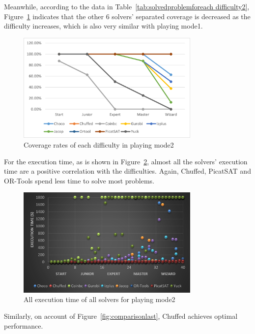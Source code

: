 Meanwhile, according to the data in Table~\ref{tab:solvedproblemforeach difficulty2}, Figure~\ref{fig:mode2eva4} indicates that the other 6 solvers' separated coverage is decreased as the difficulty increases, which is also very similar with playing mode1.
 \begin{figure}[H]
   \centering
    \includegraphics[width=0.8\textwidth]{figs/mode2seperatedcoverage.png}
    \caption{Coverage rates of each difficulty in playing mode2}
    \label{fig:mode2eva4}
\end{figure}
For the execution time, as is shown in Figure~\ref{fig:mode2time2}, almost all the solvers' execution time are a positive correlation with the difficulties. Again, Chuffed, PicatSAT and OR-Tools spend less time to solve most problems. 
\begin{figure}[H]
    \centering
    \includegraphics[width=0.8\textwidth]{figs/time2all.png}
    \caption{All execution time of all solvers for playing mode2}
    \label{fig:mode2time2}
\end{figure}
Similarly, on account of Figure~\ref{fig:comparisonlast}, Chuffed achieves optimal performance. 
